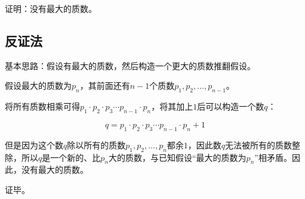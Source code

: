 

证明：没有最大的质数。

\subsection{反证法}

基本思路：假设有最大的质数，然后构造一个更大的质数推翻假设。

假设最大的质数为$p_n$，其前面还有$n - 1$个质数$p_1, p_2, \dots, p_{n - 1}$。

将所有质数相乘可得$p_1\cdot p_2\cdot p_3\cdots p_{n - 1}\cdot p_n$，将其加上$1$后可以构造一个数$q$：

\[ q = p_1\cdot p_2\cdot p_3\cdots p_{n - 1}\cdot p_n + 1 \]

但是因为这个数$q$除以所有的质数$p_1, p_2, \dots, p_n$都余$1$，因此数$q$无法被所有的质数整除，所以$q$是一个新的、比$p_n$大的质数，与已知假设“最大的质数为$p_n$”相矛盾。因此，没有最大的质数。

证毕。
